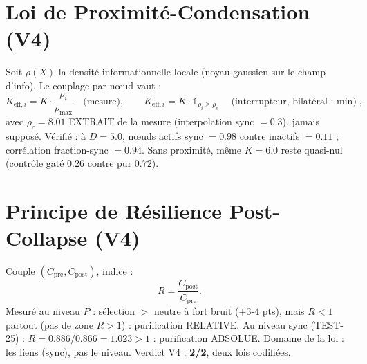 \documentclass[11pt,a4paper]{article}
\begin{document}
\section{Loi de Proximité-Condensation (V4)}
Soit $\rho(X)$ la densité informationnelle locale (noyau gaussien sur le
champ d'info). Le couplage par nœud vaut : %
\begin{equation}
K_{\mathrm{eff},i} = K \cdot \frac{\rho_i}{\rho_{\max}} \quad \text{(mesure)},
\qquad K_{\mathrm{eff},i} = K \cdot \mathbb{1}_{\rho_i \geq \rho_c}
\quad \text{(interrupteur, bilatéral : $\min$)},
\end{equation}
avec $\rho_c = 8.01$ EXTRAIT de la mesure (interpolation sync $= 0.3$),
jamais supposé. Vérifié : à $D = 5.0$, nœuds actifs sync $= 0.98$ contre
inactifs $= 0.11$ ; corrélation fraction-sync $= 0.94$. Sans proximité,
même $K = 6.0$ reste quasi-nul (contrôle gaté $0.26$ contre pur $0.72$).

\section{Principe de Résilience Post-Collapse (V4)}
Couple $(C_{\mathrm{pre}}, C_{\mathrm{post}})$, indice : %
\begin{equation}
R = \frac{C_{\mathrm{post}}}{C_{\mathrm{pre}}}.
\end{equation}
Mesuré au niveau $P$ : sélection $>$ neutre à fort bruit ($+3$-$4$ pts),
mais $R < 1$ partout (pas de zone $R > 1$) : purification RELATIVE.
Au niveau sync (TEST-25) : $R = 0.886/0.866 = 1.023 > 1$ : purification
ABSOLUE. Domaine de la loi : les liens (sync), pas le niveau.
Verdict V4 : \textbf{2/2}, deux lois codifiées.
\end{document}

